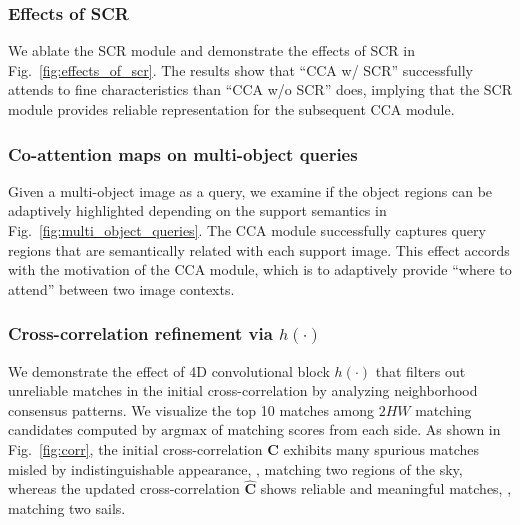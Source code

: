 \documentclass[10pt,twocolumn,letterpaper]{article}
\newcommand{\bC}{\mathbf{C}}
\newcommand{\abbself}{SCR\xspace}
\newcommand{\abbcross}{CCA\xspace}
\begin{document}
\subsubsection{Effects of \abbself}
We ablate the \abbself module and demonstrate the effects of \abbself in Fig.~\ref{fig:effects_of_scr}.
The results show that ``CCA w/ SCR'' successfully attends to fine characteristics than ``CCA w/o SCR'' does, implying that the \abbself module provides reliable representation for the subsequent \abbcross module.








\subsubsection{Co-attention maps on multi-object queries}
Given a multi-object image as a query, we examine if the object regions can be adaptively highlighted depending on the support semantics in Fig.~\ref{fig:multi_object_queries}.
The \abbcross module successfully captures query regions that are semantically related with each support image.
This effect accords with the motivation of the \abbcross module, which is to adaptively provide ``where to attend'' between two image contexts.








\subsubsection{Cross-correlation refinement via $h(\cdot)$}
We demonstrate the effect of 4D convolutional block $h(\cdot)$ that filters out unreliable matches in the initial cross-correlation by analyzing neighborhood consensus patterns.
We visualize the top 10 matches among $2HW$ matching candidates computed by $\mathrm{argmax}$ of matching scores from each side.
As shown in Fig.~\ref{fig:corr}, the initial cross-correlation $\bC$ exhibits many spurious matches misled by indistinguishable appearance, \eg, matching two regions of the sky, whereas the updated cross-correlation $\hat{\bC}$ shows reliable and meaningful matches, \eg, matching two sails. 
\end{document}

